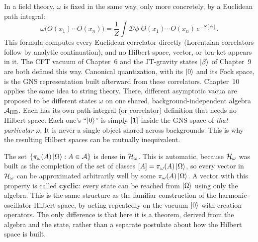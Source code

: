 \begin{physconnect}
In a field theory, $\omega$ is fixed in the same way, only more concretely, by a Euclidean path integral:
\[
\omega\big(O(x_1)\cdots O(x_n)\big) = \frac1Z\int\mathcal D\phi\;O(x_1)\cdots O(x_n)\,e^{-S[\phi]} .
\]
This formula computes every Euclidean correlator directly (Lorentzian correlators follow by analytic
continuation), and no Hilbert space, vector, or bra-ket appears in it. The CFT vacuum of Chapter~6 and the
JT-gravity states $\ket\beta$ of Chapter~9 are both defined this way. Canonical quantization, with its $\ket0$
and its Fock space, is the GNS representation built afterward from these correlators. Chapter~10 applies the
same idea to string theory. There, different asymptotic vacua are proposed to be different states $\omega$ on
one shared, background-independent algebra $\mathcal{A}_{\text{IIB}}$. Each has its own path-integral (or
correlator) definition that needs no Hilbert space. Each one's ``$\ket0$'' is simply $[\mathbf{1}]$ inside the GNS
space of \emph{that particular} $\omega$. It is never a single object shared across backgrounds. This is why
the resulting Hilbert spaces can be mutually inequivalent.
\end{physconnect}

The set $\{\pi_\omega(A)\ket\Omega : A\in\mathcal{A}\}$ is dense in $\mathcal{H}_\omega$. This is automatic, because
$\mathcal{H}_\omega$ was built as the completion of the set of classes $[A]=\pi_\omega(A)\ket\Omega$, so every vector
in $\mathcal{H}_\omega$ can be approximated arbitrarily well by some $\pi_\omega(A)\ket\Omega$. A vector with this
property is called \textbf{cyclic}: every state can be reached from $\ket\Omega$ using only the algebra. This
is the same structure as the familiar construction of the harmonic-oscillator Hilbert space, by acting
repeatedly on the vacuum $\ket0$ with creation operators. The only difference is that here it is a theorem,
derived from the algebra and the state, rather than a separate postulate about how the Hilbert space is
built.

